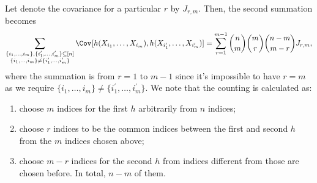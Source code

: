 Let denote the covariance for a particular \(r\) by \(J_{r, m}\). Then, the second summation becomes
\[
	\sum_{\substack{\{ i_1, \dots , i_m \} , \{ i_1^{\prime} , \dots , i_m^{\prime} \} \subseteq [n] \\ \{ i_1 , \dots , i_m \} \neq \{ i_1^{\prime} , \dots , i_m^{\prime} \}}} \Cov_{}[h(X_{i_1}, \dots , X_{i_m}) , h(X_{i_1^{\prime} }, \dots , X_{i_m^{\prime} })]
	= \sum_{r=1}^{m-1} \binom{n}{m} \binom{m}{r} \binom{n-m}{m-r} J_{r, m},
\]
where the summation is from \(r = 1\) to \(m-1\) since it's impossible to have \(r = m\) as we require \(\{ i_1 , \dots , i_m \} \neq \{ i_1^{\prime} , \dots , i_m^{\prime} \}\). We note that the counting is calculated as:
\begin{enumerate}
	\item choose \(m\) indices for the first \(h\) arbitrarily from \(n\) indices;
	\item choose \(r\) indices to be the common indices between the first and second \(h\) from the \(m\) indices chosen above;
	\item choose \(m-r\) indices for the second \(h\) from indices different from those are chosen before. In total, \(n-m\) of them.
\end{enumerate}